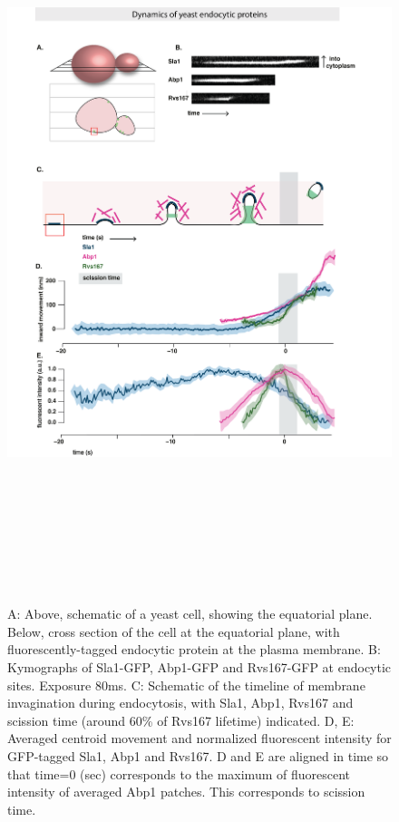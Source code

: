 	\begin{figure}[H]
	\centering
	\hspace*{-1.8cm}%
	\includegraphics[width=21.5cm,height=21.5cm,keepaspectratio, valign=t]{figures/results_final/yeast_schemat_fig1_F}
	\caption[Tracking yeast endocytic proteins]
	{A: Above, schematic of a yeast cell, showing the equatorial plane. Below, cross section of the cell at the equatorial plane, with fluorescently-tagged endocytic protein at the plasma membrane. 
B: Kymographs of Sla1-GFP, Abp1-GFP and Rvs167-GFP at endocytic sites. Exposure 80ms.
C: Schematic of the timeline of membrane invagination during endocytosis, with Sla1, Abp1, Rvs167 and scission time (around 60\% of Rvs167 lifetime) indicated. 
D, E: Averaged centroid movement and normalized fluorescent intensity for GFP-tagged Sla1, Abp1 and Rvs167. D and E are aligned in time so that time=0 (sec) corresponds to the maximum of fluorescent intensity of averaged Abp1 patches. This corresponds to scission time.
	\label{fig1_schematic}}
	\end{figure}



